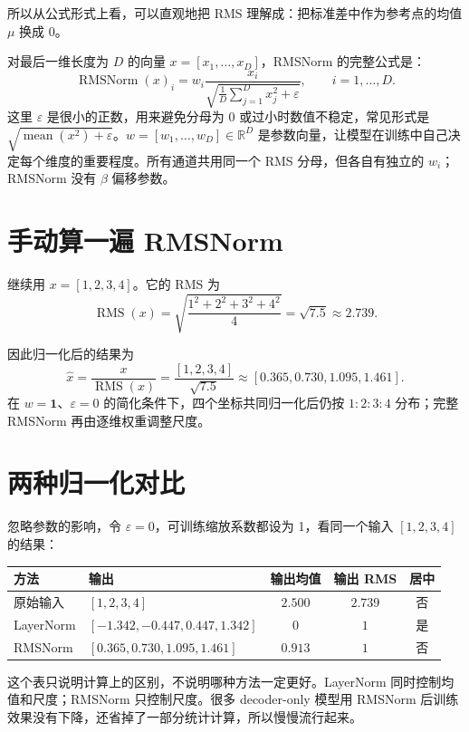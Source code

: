 \documentclass[UTF8,11pt,a4paper]{ctexart}
\begin{document}
所以从公式形式上看，可以直观地把 RMS 理解成：把标准差中作为参考点的均值 $\mu$ 换成 $0$。

对最后一维长度为 $D$ 的向量 $x=[x_1,\ldots,x_D]$，RMSNorm 的完整公式是：
\[
\operatorname{RMSNorm}(x)_i
=w_i\frac{x_i}
{\sqrt{\frac{1}{D}\sum_{j=1}^{D}x_j^2+\varepsilon}},
\qquad i=1,\ldots,D.
\]
这里 $\varepsilon$ 是很小的正数，用来避免分母为 0 或过小时数值不稳定，常见形式是 $\sqrt{\operatorname{mean}(x^2)+\varepsilon}$。$w=[w_1,\ldots,w_D]\in\mathbb{R}^D$ 是参数向量，让模型在训练中自己决定每个维度的重要程度。所有通道共用同一个 RMS 分母，但各自有独立的 $w_i$；RMSNorm 没有 $\beta$ 偏移参数。

\section{手动算一遍 RMSNorm}

继续用 $x=[1,2,3,4]$。它的 RMS 为
\[
\operatorname{RMS}(x)
=
\sqrt{\frac{1^2+2^2+3^2+4^2}{4}}
=
\sqrt{7.5}
\approx2.739.
\]

因此归一化后的结果为
\[
\widehat{x}
=
\frac{x}{\operatorname{RMS}(x)}
=
\frac{[1,2,3,4]}{\sqrt{7.5}}
\approx
[0.365,0.730,1.095,1.461].
\]
在 $w=\mathbf{1}$、$\varepsilon=0$ 的简化条件下，四个坐标共同归一化后仍按 $1:2:3:4$ 分布；完整 RMSNorm 再由逐维权重调整尺度。


\section{两种归一化对比}

忽略参数的影响，令 $\varepsilon=0$，可训练缩放系数都设为 1，看同一个输入 $[1,2,3,4]$ 的结果：

\begin{center}
\small
\begin{tabular}{p{2.1cm}p{5.1cm}ccc}
\toprule
方法 & 输出 & 输出均值 & 输出 RMS & 居中\\
\midrule
原始输入 & $[1,2,3,4]$ & $2.500$ & $2.739$ & 否\\
LayerNorm & $[-1.342,-0.447,0.447,1.342]$ & $0$ & $1$ & 是\\
RMSNorm & $[0.365,0.730,1.095,1.461]$ & $0.913$ & $1$ & 否\\
\bottomrule
\end{tabular}
\end{center}

这个表只说明计算上的区别，不说明哪种方法一定更好。LayerNorm 同时控制均值和尺度；RMSNorm 只控制尺度。很多 decoder-only 模型用 RMSNorm 后训练效果没有下降，还省掉了一部分统计计算，所以慢慢流行起来。
\end{document}
